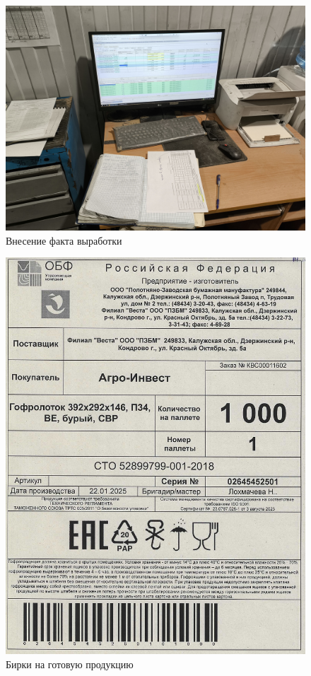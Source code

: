 \begin{figure}
\begin{center}
 \includegraphics[height=0.5\textheight, keepaspectratio]{Pics/VI рабочее место машиниста.jpg}
\end{center}
 \caption{Внесение факта выработки}
 \label{pic:VI рабочее место машиниста}
\end{figure}

\begin{figure}
\begin{center}
 \includegraphics[height=0.9\textheight, keepaspectratio]{Pics/III.10.jpg}
\end{center}
 \caption{Бирки на готовую продукцию}
 \label{pic:III.10}
\end{figure}

